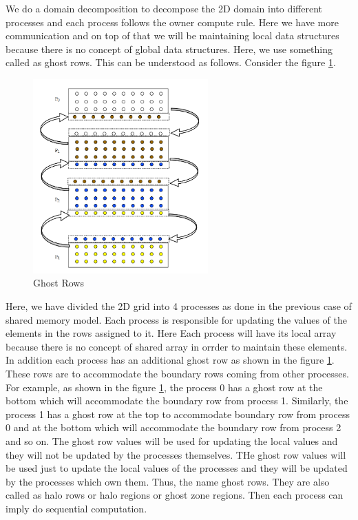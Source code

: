 \documentclass[12pt]{book}
\begin{document}
We do a domain decomposition to decompose the 2D domain into different processes and each process follows the owner compute rule.
Here we have more communication and on top of that we will be maintaining local data structures because there is no concept of global data structures.
Here, we use something called as ghost rows. This  can be understood as follows. Consider the figure \ref{fig:ghost}.
\begin{figure}[H]
    \centering
    \includegraphics[width=0.6\textwidth]{images/ghost.png}
    \caption{Ghost Rows}
    \label{fig:ghost}
\end{figure}
Here, we have divided the 2D grid into 4 processes as done in the previous case of shared memory model.
Each process is responsible for updating the values of the elements in the rows assigned to it.
Here Each process will have its local array because there is no concept of shared array in orrder to maintain these elements.
In addition each process has an additional ghost row as shown in the figure \ref{fig:ghost}.
These rows are to accommodate the boundary rows coming from other processes. For example, as shown in the figure \ref{fig:ghost},
the process 0 has a ghost row at the bottom which will accommodate the boundary row from process 1. Similarly, the process 1 has a ghost row at the top to accommodate boundary row from process 0
and at the bottom which will accommodate the boundary row from process 2 and so on.
The ghost row values will be used for updating the local values and they will not be updated by the processes themselves.
THe ghost row values will be used just to update the local values of the processes and they will be updated by the processes which own them.
Thus, the name ghost rows. They are also called as halo rows or halo regions or ghost zone regions.
Then each process can imply do sequential computation.
\end{document}
